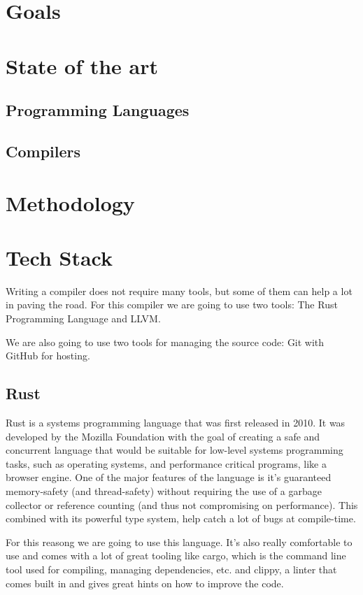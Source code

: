 ﻿\documentclass[10pt,a4paper,twocolumn,twoside]{article}
\begin{document}
\section{Goals}

\section{State of the art}
\subsection{Programming Languages}
\subsection{Compilers}

\section{Methodology}

\section{Tech Stack}

Writing a compiler does not require many tools, but some of them can help a lot
in paving the road. For this compiler we are going to use two tools: 
The Rust Programming Language and LLVM.

We are also going to use two tools for managing the source code: Git with GitHub
for hosting.

\subsection{Rust}
Rust is a systems programming language that was first released in 2010. It was
developed by the Mozilla Foundation with the goal of creating a safe and
concurrent language that would be suitable for low-level systems programming
tasks, such as operating systems, and performance critical programs, like a
browser engine. One of the major features of the language is it's guaranteed
memory-safety (and thread-safety) without requiring the use of a garbage
collector or reference counting (and thus not compromising on performance).
This combined with its powerful type system, help catch a lot of bugs at 
compile-time.

For this reasong we are going to use this language. It's also really comfortable
to use and comes with a lot of great tooling like cargo, which is the command 
line tool used for compiling, managing dependencies, etc. and clippy, a linter
that comes built in and gives great hints on how to improve the code.
\end{document}
